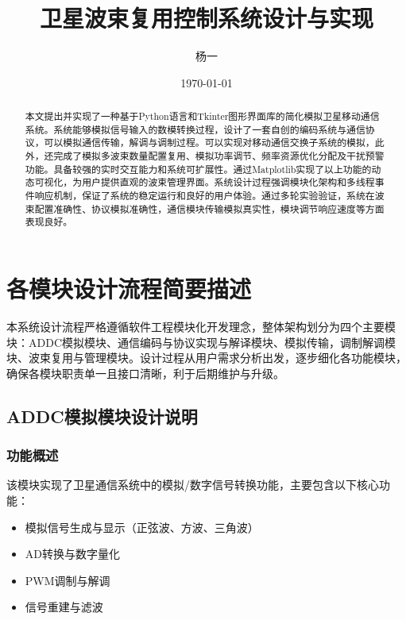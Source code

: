 \documentclass[12pt]{article}
\title{卫星波束复用控制系统设计与实现}
\author{杨一}
\date{\today}
\begin{document}
\maketitle

\begin{abstract}
本文提出并实现了一种基于Python语言和Tkinter图形界面库的简化模拟卫星移动通信系统。系统能够模拟信号输入的数模转换过程，设计了一套自创的编码系统与通信协议，可以模拟通信传输，解调与调制过程。可以实现对移动通信交换子系统的模拟，此外，还完成了模拟多波束数量配置复用、模拟功率调节、频率资源优化分配及干扰预警功能。具备较强的实时交互能力和系统可扩展性。通过Matplotlib实现了以上功能的动态可视化，为用户提供直观的波束管理界面。系统设计过程强调模块化架构和多线程事件响应机制，保证了系统的稳定运行和良好的用户体验。通过多轮实验验证，系统在波束配置准确性、协议模拟准确性，通信模块传输模拟真实性，模块调节响应速度等方面表现良好。
\end{abstract}

\section{各模块设计流程简要描述}
本系统设计流程严格遵循软件工程模块化开发理念，整体架构划分为四个主要模块：ADDC模拟模块、通信编码与协议实现与解译模块、模拟传输，调制解调模块、波束复用与管理模块。设计过程从用户需求分析出发，逐步细化各功能模块，确保各模块职责单一且接口清晰，利于后期维护与升级。




\subsection{ADDC模拟模块设计说明}

\subsubsection{功能概述}
该模块实现了卫星通信系统中的模拟/数字信号转换功能，主要包含以下核心功能：
\begin{itemize}
    \item 模拟信号生成与显示（正弦波、方波、三角波）
    \item AD转换与数字量化
    \item PWM调制与解调
    \item 信号重建与滤波
\end{itemize}
\end{document}
